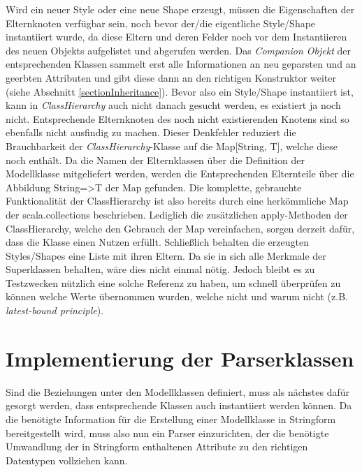 Wird ein neuer Style oder eine neue Shape erzeugt, müssen die Eigenschaften der Elternknoten verfügbar sein, noch bevor der/die eigentliche Style/Shape instantiiert wurde, da diese Eltern und deren Felder noch vor dem Instantiieren des neuen Objekts aufgelistet und abgerufen werden. Das \textit{Companion Objekt} der entsprechenden Klassen sammelt erst alle Informationen an neu geparsten und an geerbten Attributen und gibt diese dann an den richtigen Konstruktor weiter (siehe Abschnitt \ref{sectionInheritance}). Bevor also ein Style/Shape instantiiert ist, kann in \textit{ClassHierarchy} auch nicht danach gesucht werden, es existiert ja noch nicht. Entsprechende Elternknoten des noch nicht existierenden Knotens sind so ebenfalls nicht ausfindig zu machen. Dieser Denkfehler reduziert die Brauchbarkeit der \textit{ClassHierarchy}-Klasse auf die Map[String, T], welche diese noch enthält. Da die Namen der Elternklassen über die Definition der Modellklasse mitgeliefert werden, werden die Entsprechenden Elternteile über die Abbildung String=\textgreater T der Map gefunden.
Die komplette, gebrauchte Funktionalität der ClassHierarchy ist also bereits durch eine herkömmliche Map der scala.collections beschrieben. Lediglich die zusätzlichen apply-Methoden der ClassHierarchy, welche den Gebrauch der Map vereinfachen, sorgen derzeit dafür, dass die Klasse einen Nutzen erfüllt. Schließlich behalten die erzeugten Styles/Shapes eine Liste mit ihren Eltern. Da sie in sich alle Merkmale der Superklassen behalten, wäre dies nicht einmal nötig. Jedoch bleibt es zu Testzwecken nützlich eine solche Referenz zu haben, um schnell überprüfen zu können welche Werte übernommen wurden, welche nicht und warum nicht (z.B. \textit{latest-bound principle}).
\section{Implementierung der Parserklassen}
Sind die Beziehungen unter den Modellklassen definiert, muss als nächstes dafür gesorgt werden, dass entsprechende Klassen auch instantiiert werden können. Da die benötigte Information für die Erstellung einer Modellklasse in Stringform bereitgestellt wird, muss also nun ein Parser einzurichten, der die benötigte Umwandlung der in Stringform enthaltenen Attribute zu den richtigen Datentypen vollziehen kann.
